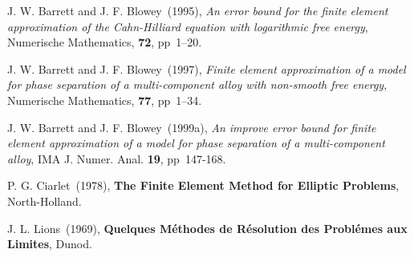 \begin{thebibliography}{999}

J. W. Barrett and J. F. Blowey~(1995),  
{\it An error bound for the finite element approximation of the Cahn-Hilliard equation with logarithmic free energy}, 
Numerische Mathematics, 
{\bf 72}, pp~1--20.

J. W. Barrett and J. F. Blowey~(1997),  
{\it Finite element approximation of a model for phase separation of a multi-component alloy with non-smooth free energy}, 
Numerische Mathematics, 
{\bf 77}, pp~1--34.

J. W. Barrett and J. F. Blowey~(1999a),  
{\it An improve error bound for finite element approximation of a
model for phase separation of a multi-component alloy}, 
IMA J. Numer. Anal.  
{\bf 19}, pp~147-168.

P. G. Ciarlet~(1978),
{\bf The Finite Element Method for Elliptic Problems}, 
North-Holland. 

J. L. Lions~(1969),
{\bf Quelques M\'ethodes de R\'esolution
des Probl\'emes aux Limites}, 
Dunod.

\end{thebibliography}




